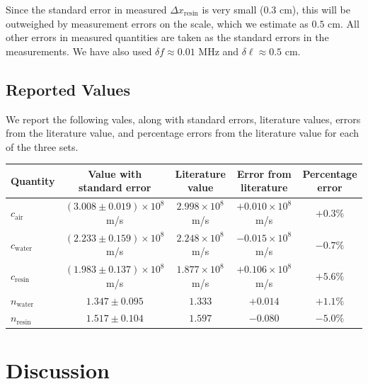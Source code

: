 \documentclass[11pt]{article}
\begin{document}
        Since the standard error in measured $\Delta x_\text{resin}$ is very small ($0.3$ cm), this will be outweighed by measurement errors
        on the scale, which we estimate as $0.5$ cm.
        All other errors in measured quantities are taken as the standard errors in the measurements.
        We have also used $\delta f \approx 0.01$ MHz and $\delta\ell \approx 0.5$ cm.

        \subsection{Reported Values}
        We report the following vales, along with standard errors, literature values, errors from the literature value, and percentage errors
        from the literature value for each of the three sets.
        \begin{center}
        \begin{tabular}{lcccc}
        Quantity        & Value with standard error             & Literature value              & Error from literature         & Percentage error
        \\\hline
        $c_\text{air}$  & $(3.008 \pm 0.019) \times 10^8$ m/s   & $2.998 \times 10^8$ m/s       & $+0.010 \times 10^8$ m/s      & $+0.3\%$ \\
        $c_\text{water}$& $(2.233 \pm 0.159) \times 10^8$ m/s   & $2.248 \times 10^8$ m/s       & $-0.015 \times 10^8$ m/s      & $-0.7\%$ \\
        $c_\text{resin}$& $(1.983 \pm 0.137) \times 10^8$ m/s   & $1.877 \times 10^8$ m/s       & $+0.106 \times 10^8$ m/s      & $+5.6\%$ \\
        $n_\text{water}$& $1.347 \pm 0.095$                     & $1.333$                       & $+0.014$                      & $+1.1\%$ \\
        $n_\text{resin}$& $1.517 \pm 0.104$                     & $1.597$                       & $-0.080$                      & $-5.0\%$
        \end{tabular}
        \end{center}
        
        \section{Discussion}
        
\end{document}
